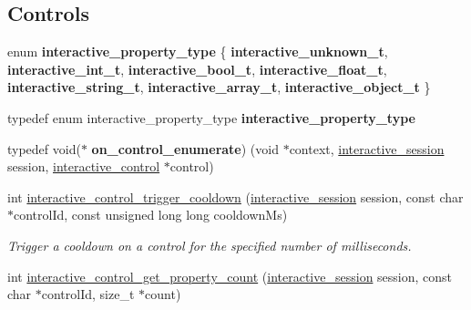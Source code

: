 \subsection*{Controls}
\begin{DoxyCompactItemize}
\item 
\mbox{\label{group___interactivity_ga1e8e836fc4022fccb78ca071a39779cf}} 
enum {\bfseries interactive\+\_\+property\+\_\+type} \{ \newline
{\bfseries interactive\+\_\+unknown\+\_\+t}, 
{\bfseries interactive\+\_\+int\+\_\+t}, 
{\bfseries interactive\+\_\+bool\+\_\+t}, 
{\bfseries interactive\+\_\+float\+\_\+t}, 
\newline
{\bfseries interactive\+\_\+string\+\_\+t}, 
{\bfseries interactive\+\_\+array\+\_\+t}, 
{\bfseries interactive\+\_\+object\+\_\+t}
 \}
\item 
\mbox{\label{group___interactivity_ga861902ce154f552221fd2c2b8487a454}} 
typedef enum interactive\+\_\+property\+\_\+type {\bfseries interactive\+\_\+property\+\_\+type}
\item 
\mbox{\label{group___interactivity_ga0e0fddb9f4eca91f689132be106b421b}} 
typedef void($\ast$ {\bfseries on\+\_\+control\+\_\+enumerate}) (void $\ast$context, \mbox{\hyperlink{group___interactivity_ga6d8819d38b8dc8994a2299cf22a65a31}{interactive\+\_\+session}} session, \mbox{\hyperlink{structinteractive__control}{interactive\+\_\+control}} $\ast$control)
\item 
int \mbox{\hyperlink{group___interactivity_gae648fbf545602c1822dae3467da34b71}{interactive\+\_\+control\+\_\+trigger\+\_\+cooldown}} (\mbox{\hyperlink{group___interactivity_ga6d8819d38b8dc8994a2299cf22a65a31}{interactive\+\_\+session}} session, const char $\ast$control\+Id, const unsigned long long cooldown\+Ms)
\begin{DoxyCompactList}\small\item\em Trigger a cooldown on a control for the specified number of milliseconds. \end{DoxyCompactList}\item 
int \mbox{\hyperlink{group___interactivity_ga3b852e6de50a4af31a8032fcc7094328}{interactive\+\_\+control\+\_\+get\+\_\+property\+\_\+count}} (\mbox{\hyperlink{group___interactivity_ga6d8819d38b8dc8994a2299cf22a65a31}{interactive\+\_\+session}} session, const char $\ast$control\+Id, size\+\_\+t $\ast$count)

\end{DoxyCompactItemize}
